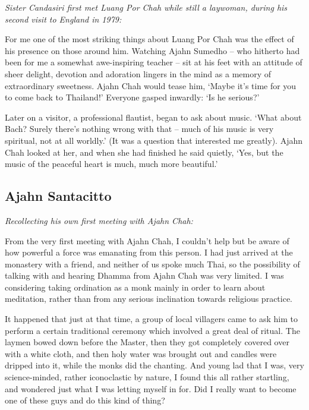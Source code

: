 \emph{Sister Candasiri first met Luang Por Chah while still a
laywoman, during his second visit to England in 1979:}

For me one of the most striking things about Luang Por Chah was the
effect of his presence on those around him. Watching Ajahn Sumedho --
who hitherto had been for me a somewhat awe-inspiring teacher -- sit at
his feet with an attitude of sheer delight, devotion and adoration
lingers in the mind as a memory of extraordinary sweetness. Ajahn Chah
would tease him, `Maybe it's time for you to come back to Thailand!'
Everyone gasped inwardly: `Is he serious?'

Later on a visitor, a professional flautist, began to ask about music.
`What about Bach? Surely there's nothing wrong with that -- much of his
music is very spiritual, not at all worldly.' (It was a question that
interested me greatly). Ajahn Chah looked at her, and when she had
finished he said quietly, `Yes, but the music of the peaceful heart is
much, much more beautiful.'

\subsection{Ajahn Santacitto}

\emph{Recollecting his own first meeting with Ajahn Chah:}

From the very first meeting with Ajahn Chah, I couldn't help but be
aware of how powerful a force was emanating from this person. I had just
arrived at the monastery with a friend, and neither of us spoke much
Thai, so the possibility of talking with and hearing Dhamma from Ajahn
Chah was very limited. I was considering taking ordination as a monk
mainly in order to learn about meditation, rather than from any serious
inclination towards religious practice. 

It happened that just at that time, a group of local villagers came to
ask him to perform a certain traditional ceremony which involved a great
deal of ritual. The laymen bowed down before the Master, then they got
completely covered over with a white cloth, and then holy water was
brought out and candles were dripped into it, while the monks did the
chanting. And young lad that I was, very science-minded, rather
iconoclastic by nature, I found this all rather startling, and wondered
just what I was letting myself in for. Did I really want to become one
of these guys and do this kind of thing? 


